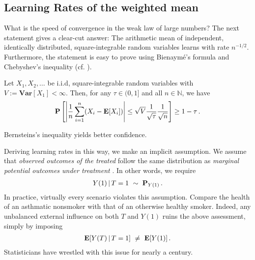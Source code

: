 

\subsection{Learning Rates of the weighted mean}

What is the speed of convergence in the weak law of large numbers?
The next statement gives a clear-cut answer:
The arithmetic mean of independent, identically distributed, square-integrable random variables 
learns with rate $n^{-1/2}$.
Furthermore, the statement is easy to prove using
Bienaymé's formula and Chebyshev's inequality (cf. \cite[Theorem~5.14]{Klenke2020}).


\begin{theorem*}
  Let 
  $
    X_1,X_2,\ldots
  $
  be i.i.d, square-integrable random variables with 
  $
    V:=
    \mathbf{Var}[X_1]
    <\infty
  $.
  Then, for any $\tau \in (0,1]$ and all $n\in\mathbb{N}$, we have
  \begin{gather}
   \mathbf{P}
   \left[
     \left| 
   \frac{1}{n}
   \sum_{i=1}^{n}
   (X_i - \mathbf{E}[X_i])
     \right|
     \le
     \sqrt{V}
     \frac{1}{\sqrt{\tau}}
     \frac{1}{\sqrt{n}}
   \right]
   \ge
   1-\tau\,.
  \end{gather}
\end{theorem*}
\begin{reflection*}
  Bernsteins's inequality yields better confidence.
\end{reflection*}

Deriving learning rates in this way, we make an implicit assumption.
We assume that \textit{observed outcomes of the treated}
follow the same distribution as
\textit{
marginal potential outcomes under treatment
}.
In other words, we require
\begin{gather}
  Y(1)\,|\,T=1
  \ 
  \sim 
  \ 
  \P_
  {
  Y(1)
  }
  \,.
\end{gather}
In practice, virtually every scenario violates this assumption.
Compare the health of an asthmatic nonsmoker with that of an otherwise healthy smoker.
  Indeed, any unbalanced external influence on both $T$ and $Y(1)$ ruins the 
above assessment, simply by imposing 
\begin{gather}
  \mathbf{E}[Y(T)\,|\, T=1]\ \neq\  \mathbf{E}[Y(1)]
  \,.
\end{gather}
Statisticians have wrestled with this issue for nearly a century.

